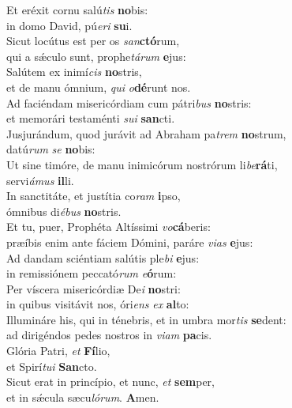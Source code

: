 \evenverse Et eréxit cornu salú\textit{tis} \textbf{no}bis:~\*\\
\evenverse in domo David, pú\textit{e}\textit{ri} \textbf{su}i.\\
\oddverse Sicut locútus est per os \textit{san}\textbf{ctó}rum,~\*\\
\oddverse qui a sǽculo sunt, prophe\textit{tá}\textit{rum} \textbf{e}jus:\\
\evenverse Salútem ex inimí\textit{cis} \textbf{no}stris,~\*\\
\evenverse et de manu ómnium, \textit{qui} \textit{o}\textbf{dé}runt nos.\\
\oddverse Ad faciéndam misericórdiam cum pátri\textit{bus} \textbf{no}stris:~\*\\
\oddverse et memorári testaménti \textit{su}\textit{i} \textbf{san}cti.\\
\evenverse Jusjurándum, quod jurávit ad Abraham pa\textit{trem} \textbf{no}strum,~\*\\
\evenverse datú\textit{rum} \textit{se} \textbf{no}bis:\\
\oddverse Ut sine timóre, de manu inimicórum nostrórum li\textit{be}\textbf{rá}ti,~\*\\
\oddverse servi\textit{á}\textit{mus} \textbf{il}li.\\
\evenverse In sanctitáte, et justítia co\textit{ram} \textbf{i}pso,~\*\\
\evenverse ómnibus di\textit{é}\textit{bus} \textbf{no}stris.\\
\oddverse Et tu, puer, Prophéta Altíssimi \textit{vo}\textbf{cá}beris:~\*\\
\oddverse præíbis enim ante fáciem Dómini, paráre \textit{vi}\textit{as} \textbf{e}jus:\\
\evenverse Ad dandam sciéntiam salútis ple\textit{bi} \textbf{e}jus:~\*\\
\evenverse in remissiónem peccató\textit{rum} \textit{e}\textbf{ó}rum:\\
\oddverse Per víscera misericórdiæ De\textit{i} \textbf{no}stri:~\*\\
\oddverse in quibus visitávit nos, óri\textit{ens} \textit{ex} \textbf{al}to:\\
\evenverse Illumináre his, qui in ténebris, et in umbra mor\textit{tis} \textbf{se}dent:~\*\\
\evenverse ad dirigéndos pedes nostros in \textit{vi}\textit{am} \textbf{pa}cis.\\
\oddverse Glória Patri, \textit{et} \textbf{Fí}lio,~\*\\
\oddverse et Spirí\textit{tu}\textit{i} \textbf{San}cto.\\
\evenverse Sicut erat in princípio, et nunc, \textit{et} \textbf{sem}per,~\*\\
\evenverse et in sǽcula sæcu\textit{ló}\textit{rum}. \textbf{A}men.\\
